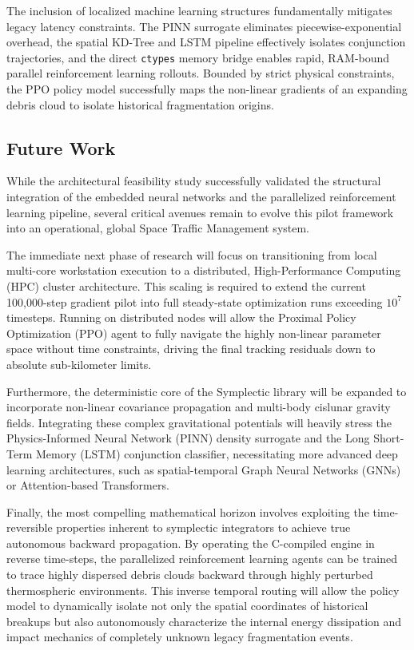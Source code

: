 \documentclass[letterpaper,11pt]{AAS}
\begin{document}
The inclusion of localized machine learning structures fundamentally mitigates legacy latency constraints. The PINN surrogate eliminates piecewise-exponential overhead, the spatial KD-Tree and LSTM pipeline effectively isolates conjunction trajectories, and the direct \texttt{ctypes} memory bridge enables rapid, RAM-bound parallel reinforcement learning rollouts. Bounded by strict physical constraints, the PPO policy model successfully maps the non-linear gradients of an expanding debris cloud to isolate historical fragmentation origins.

\subsection{Future Work}
While the architectural feasibility study successfully validated the structural integration of the embedded neural networks and the parallelized reinforcement learning pipeline, several critical avenues remain to evolve this pilot framework into an operational, global Space Traffic Management system. 

The immediate next phase of research will focus on transitioning from local multi-core workstation execution to a distributed, High-Performance Computing (HPC) cluster architecture. This scaling is required to extend the current 100,000-step gradient pilot into full steady-state optimization runs exceeding $10^7$ timesteps. Running on distributed nodes will allow the Proximal Policy Optimization (PPO) agent to fully navigate the highly non-linear parameter space without time constraints, driving the final tracking residuals down to absolute sub-kilometer limits.

Furthermore, the deterministic core of the Symplectic library will be expanded to incorporate non-linear covariance propagation and multi-body cislunar gravity fields. Integrating these complex gravitational potentials will heavily stress the Physics-Informed Neural Network (PINN) density surrogate and the Long Short-Term Memory (LSTM) conjunction classifier, necessitating more advanced deep learning architectures, such as spatial-temporal Graph Neural Networks (GNNs) or Attention-based Transformers.

Finally, the most compelling mathematical horizon involves exploiting the time-reversible properties inherent to symplectic integrators to achieve true autonomous backward propagation. By operating the C-compiled engine in reverse time-steps, the parallelized reinforcement learning agents can be trained to trace highly dispersed debris clouds backward through highly perturbed thermospheric environments. This inverse temporal routing will allow the policy model to dynamically isolate not only the spatial coordinates of historical breakups but also autonomously characterize the internal energy dissipation and impact mechanics of completely unknown legacy fragmentation events.



\end{document}
